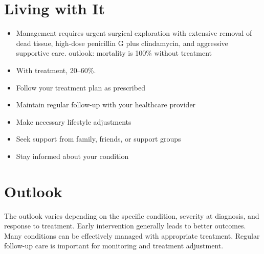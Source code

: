 \section{Living with It}
\begin{itemize}[noitemsep]
  \item Management requires urgent surgical exploration with extensive removal of dead tissue, high-dose penicillin G plus clindamycin, and aggressive supportive care. outlook: mortality is 100\% without treatment
  \item With treatment, 20--60\%.
  \item Follow your treatment plan as prescribed
  \item Maintain regular follow-up with your healthcare provider
  \item Make necessary lifestyle adjustments
  \item Seek support from family, friends, or support groups
  \item Stay informed about your condition
\end{itemize}
\section{Outlook}
The outlook varies depending on the specific condition, severity at diagnosis, and response to treatment. Early intervention generally leads to better outcomes. Many conditions can be effectively managed with appropriate treatment. Regular follow-up care is important for monitoring and treatment adjustment.
